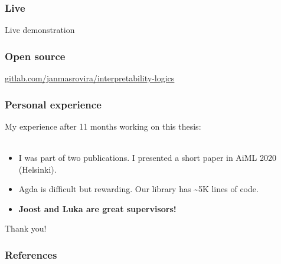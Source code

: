 \documentclass[xcolor={x11names}]{beamer}
\begin{document}
\begin{frame}
  \frametitle{Live}
  \centering \Huge Live demonstration
\end{frame}


\begin{frame}
  \frametitle{Open source}
  \centering
  \href{https://gitlab.com/janmasrovira/interpretability-logics}{gitlab.com/janmasrovira/interpretability-logics}
\end{frame}

\begin{frame}
  \frametitle{Personal experience}
  \centering \large My experience after 11 months working on this thesis:
  \\~\\
  \begin{itemize}
  \item I was part of two publications. I presented a short paper in AiML 2020
    (Helsinki). \break{} \pause{}
  \item Agda is difficult but rewarding. Our library has \textasciitilde{}5K
    lines of code. \break{} \pause{}

  \item \textbf{Joost and Luka are great supervisors!}
  \end{itemize}
\end{frame}


\begin{frame}
  \centering \Huge Thank you!
\end{frame}

\begin{frame}[allowframebreaks]
  \frametitle{References}
  \nocite{joosten2020overview}
  \nocite{Verbrugge}
  \printbibliography{}
\end{frame}
\end{document}
